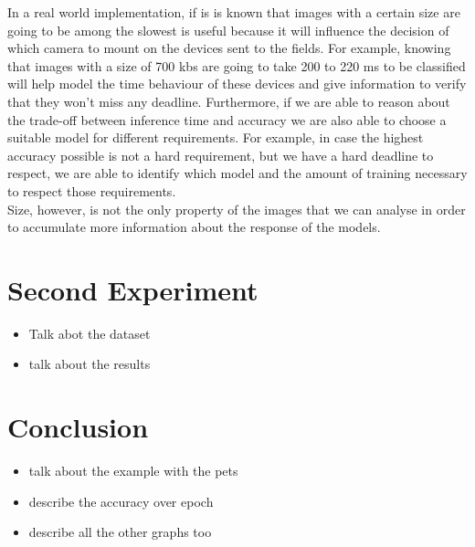 In a real world implementation, if is is known that images with a certain size are going to be among the slowest is useful because it will influence the decision of which camera to mount on the devices sent to the fields. For example, knowing that images with a size of 700 kbs are going to take 200 to 220 ms to be classified will help model the time behaviour of these devices and give information to verify that they won't miss any deadline. Furthermore, if we are able to reason about the trade-off between inference time and accuracy we are also able to choose a suitable model for different requirements. For example, in case the highest accuracy possible is not a hard requirement, but we have a hard deadline to respect, we are able to identify which model and the amount of training necessary to respect those requirements. \\

Size, however, is not the only property of the images that we can analyse in order to accumulate more information about the response of the models.  
\section{Second Experiment}
\begin{itemize}
\item Talk abot the dataset
\item talk about the results
\end{itemize}
\section{Conclusion}

\begin{itemize}
\item talk about the example with the pets
\item describe the accuracy over epoch
\item describe all the other graphs too
\end{itemize}
